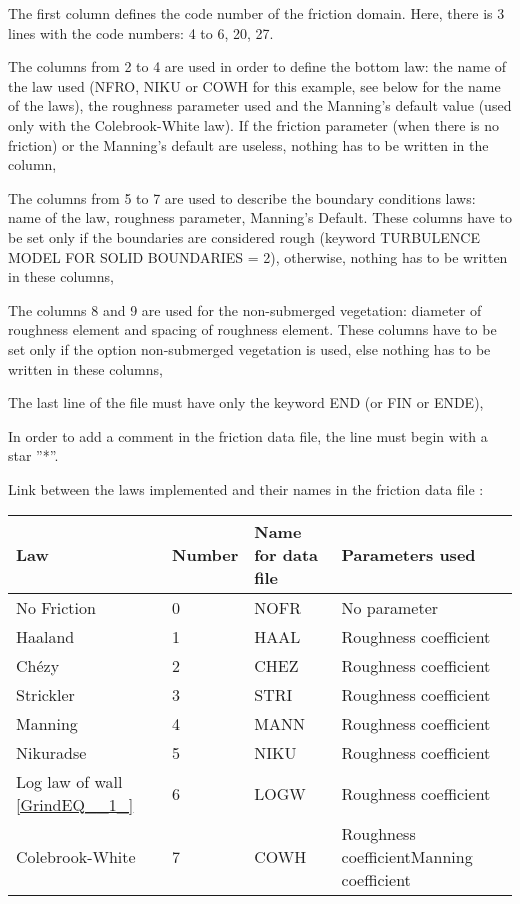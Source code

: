 \documentclass{article} %
\begin{document}
 The first column defines the code number of the friction domain. Here, there is 3 lines with the code numbers: 4 to 6, 20, 27.

 The columns from 2 to 4 are used in order to define the bottom law: the name of the law used (NFRO, NIKU or COWH for this example, see below for the name of the laws), the roughness parameter used and the Manning's default value (used only with the Colebrook-White law). If the friction parameter (when there is no friction) or the Manning's default are useless, nothing has to be written in the column,

 The columns from 5 to 7 are used to describe the boundary conditions laws: name of the law, roughness parameter, Manning's Default. These columns have to be set only if the boundaries are considered rough (keyword TURBULENCE MODEL FOR SOLID BOUNDARIES = 2), otherwise, nothing has to be written in these columns,

 The columns 8 and 9 are used for the non-submerged vegetation: diameter of roughness element and spacing of roughness element. These columns have to be set only if the option non-submerged vegetation is used, else nothing has to be written in these columns,

 The last line of the file must have only the keyword END (or FIN or ENDE),

 In order to add a comment in the friction data file, the line must begin with a star ''*''.





  Link between the laws implemented and their names in the friction data file :



\begin{tabular}{|p{1.0in}|p{0.4in}|p{0.8in}|p{1.0in}|} \hline
Law &  Number & Name for data file & Parameters used \\ \hline
No Friction & 0 & NOFR & No parameter \\ \hline
Haaland & 1 & HAAL & Roughness coefficient \\ \hline
Ch\'{e}zy & 2 & CHEZ & Roughness coefficient \\ \hline
Strickler & 3 & STRI & Roughness coefficient \\ \hline
Manning & 4 & MANN & Roughness coefficient \\ \hline
Nikuradse & 5 & NIKU & Roughness coefficient \\ \hline
Log law of wall \eqref{GrindEQ__1_} & 6 & LOGW & Roughness coefficient \\ \hline
Colebrook-White & 7 & COWH & Roughness coefficient\newline Manning coefficient \\ \hline
\end{tabular}
\end{document}
